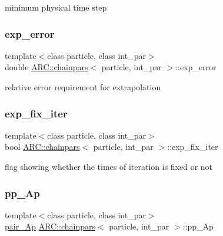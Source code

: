 minimum physical time step 

\hypertarget{classARC_1_1chainpars_aa2d74e007387438a5c9a36a7b29cbd1f}{}\label{classARC_1_1chainpars_aa2d74e007387438a5c9a36a7b29cbd1f} 
\subsubsection{\texorpdfstring{exp\+\_\+error}{exp\_error}}
{\footnotesize\ttfamily template$<$class particle, class int\+\_\+par$>$ \\
double \hyperlink{classARC_1_1chainpars}{A\+R\+C\+::chainpars}$<$ particle, int\+\_\+par $>$\+::exp\+\_\+error}



relative error requirement for extrapolation 

\hypertarget{classARC_1_1chainpars_abd2d2eab7208c4579dbfd9c624ecdf85}{}\label{classARC_1_1chainpars_abd2d2eab7208c4579dbfd9c624ecdf85} 
\subsubsection{\texorpdfstring{exp\+\_\+fix\+\_\+iter}{exp\_fix\_iter}}
{\footnotesize\ttfamily template$<$class particle, class int\+\_\+par$>$ \\
bool \hyperlink{classARC_1_1chainpars}{A\+R\+C\+::chainpars}$<$ particle, int\+\_\+par $>$\+::exp\+\_\+fix\+\_\+iter}



flag showing whether the times of iteration is fixed or not 

\hypertarget{classARC_1_1chainpars_a0eb053974e399ff5c23c98069692c250}{}\label{classARC_1_1chainpars_a0eb053974e399ff5c23c98069692c250} 
\subsubsection{\texorpdfstring{pp\+\_\+\+Ap}{pp\_Ap}}
{\footnotesize\ttfamily template$<$class particle, class int\+\_\+par$>$ \\
\hyperlink{classARC_1_1chainpars_aa34d083090c50f572d2126262e169474}{pair\+\_\+\+Ap} \hyperlink{classARC_1_1chainpars}{A\+R\+C\+::chainpars}$<$ particle, int\+\_\+par $>$\+::pp\+\_\+\+Ap}



